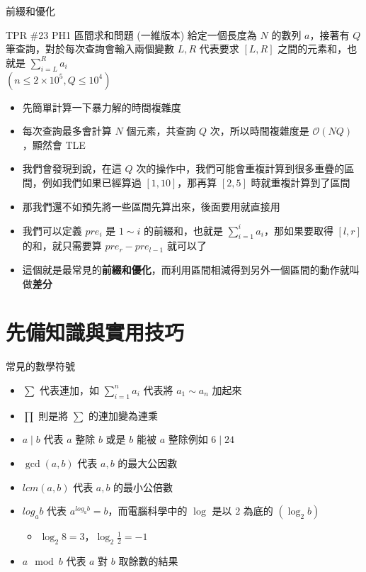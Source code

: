 \documentclass[aspectratio=169]{beamer}
\begin{document}
	\begin{frame}{前綴和優化}
		\begin{block}{TPR \#23 PH1 區間求和問題 (一維版本)}
			給定一個長度為 $N$ 的數列 $a$，接著有 $Q$ 筆查詢，對於每次查詢會輸入兩個變數 $L, R$ 代表要求 $[L, R]$ 之間的元素和，也就是 $\sum_{i=L}^{R}{a_i}$\\
			$(n \le 2 \times 10^5, Q \le 10^4)$
		\end{block}

		\begin{itemize}
			\item<2-> 先簡單計算一下暴力解的時間複雜度
			\item<3-> 每次查詢最多會計算 $N$ 個元素，共查詢 $Q$ 次，所以時間複雜度是 $\mathcal{O}(NQ)$，顯然會 TLE
			\item<4-> 我們會發現到說，在這 $Q$ 次的操作中，我們可能會重複計算到很多重疊的區間，例如我們如果已經算過 $[1, 10]$，那再算 $[2, 5]$ 時就重複計算到了區間
			\item<5-> 那我們還不如預先將一些區間先算出來，後面要用就直接用
			\item<6-> 我們可以定義 $pre_i$ 是 $1 \sim i$ 的前綴和，也就是 $\sum_{i=1}^{i}{a_i}$，那如果要取得 $[l, r]$ 的和，就只需要算 $pre_r - pre_{l-1}$ 就可以了
			\item<7-> 這個就是最常見的\textbf{前綴和優化}，而利用區間相減得到另外一個區間的動作就叫做\textbf{差分}
		\end{itemize}
	\end{frame}

	\section{先備知識與實用技巧}

	\begin{frame}{常見的數學符號}
		\begin{itemize}
			\item $\sum$ 代表連加，如 $\displaystyle\sum_{i=1}^{n}{a_i}$ 代表將 $a_1 \sim a_n$ 加起來
			\item $\prod$ 則是將 $\sum$ 的連加變為連乘
			\item $a \mid b$ 代表 $a$ 整除 $b$ 或是 $b$ 能被 $a$ 整除例如 $6 \mid 24$
			\item $\gcd(a, b)$ 代表 $a,b$ 的最大公因數
			\item $lcm(a, b)$ 代表 $a,b$ 的最小公倍數
			\item $log_a{b}$ 代表 $a^{log_a{b}} = b$，而電腦科學中的 $\log$ 是以 $2$ 為底的 $(\log_2{b})$
				\begin{itemize}
					\item $\log_2{8}=3$，$\log_2{\frac{1}{2}}=-1$
				\end{itemize}
			\item $a\mod{b}$ 代表 $a$ 對 $b$ 取餘數的結果
		\end{itemize}
	\end{frame}
\end{document}
